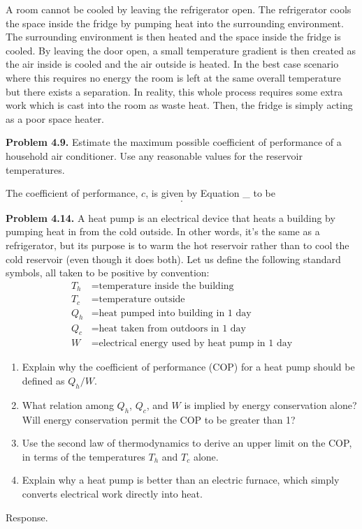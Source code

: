 \documentclass[a4paper, 12pt]{config/homework}
\begin{document}
\bigskip
\noindent
A room cannot be cooled by leaving the refrigerator open. The refrigerator cools the space inside the fridge by pumping heat into the surrounding environment. The surrounding environment is then heated and the space inside the fridge is cooled. By leaving the door open, a small temperature gradient is then created as the air inside is cooled and the air outside is heated. In the best case scenario where this requires no energy the room is left at the same overall temperature but there exists a separation. In reality, this whole process requires some extra work which is cast into the room as waste heat. Then, the fridge is simply acting as a poor space heater.

\pagebreak
\noindent
\textbf{Problem 4.9.} Estimate the maximum possible coefficient of performance of a household air conditioner. Use any reasonable values for the reservoir temperatures.

\bigskip
\noindent
The coefficient of performance, \(c\), is given by Equation \_ to be
\[ .\]

\pagebreak
\noindent
\textbf{Problem 4.14.} A heat pump is an electrical device that heats a building by pumping heat in from the cold outside. In other words, it's the same as a refrigerator, but its purpose is to warm the hot reservoir rather than to cool the cold reservoir (even though it does both). Let us define the following standard symbols, all taken to be positive by convention:
\begin{align*}
   T_h &= \text{temperature inside the building}
\\ T_c &= \text{temperature outside}
\\ Q_h &= \text{heat pumped into building in 1 day}
\\ Q_c &= \text{heat taken from outdoors in 1 day}
\\ W   &= \text{electrical energy used by heat pump in 1 day}
\end{align*}
\begin{enumerate}[label=\textbf{(\alph*)}]
\item Explain why the coefficient of performance (COP) for a heat pump should be defined as \(Q_h/W\).
\item What relation among \(Q_h\), \(Q_c\), and \(W\) is implied by energy conservation alone? Will energy conservation permit the COP to be greater than 1?
\item Use the second law of thermodynamics to derive an upper limit on the COP, in terms of the temperatures \(T_h\) and \(T_c\) alone.
\item Explain why a heat pump is better than an electric furnace, which simply converts electrical work directly into heat.
\end{enumerate}
\noindent
Response.
\end{document}
